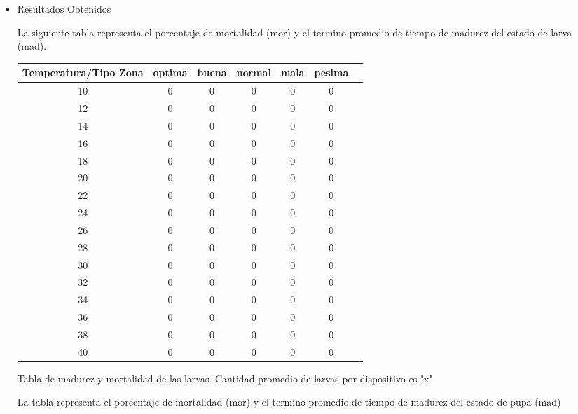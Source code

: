 \documentclass[a4paper]{article}
\begin{document}
\begin{itemize}
\item Resultados Obtenidos

La siguiente tabla representa el porcentaje de mortalidad (mor) y el termino
promedio de tiempo de madurez del estado de larva (mad).\\

\begin{tabular}{c*{5}{c}r}
Temperatura/Tipo Zona              &optima&buena &normal & mala & pesima  \\
\hline
10 & 0 & 0 & 0 & 0 & 0   \\
12 & 0 & 0 & 0 & 0 & 0   \\
14 & 0 & 0 & 0 & 0 & 0   \\
16 & 0 & 0 & 0 & 0 & 0   \\
18 & 0 & 0 & 0 & 0 & 0   \\
20 & 0 & 0 & 0 & 0 & 0   \\
22 & 0 & 0 & 0 & 0 & 0   \\
24 & 0 & 0 & 0 & 0 & 0   \\
26 & 0 & 0 & 0 & 0 & 0   \\
28 & 0 & 0 & 0 & 0 & 0   \\
30 & 0 & 0 & 0 & 0 & 0   \\
32 & 0 & 0 & 0 & 0 & 0   \\
34 & 0 & 0 & 0 & 0 & 0   \\
36 & 0 & 0 & 0 & 0 & 0   \\
38 & 0 & 0 & 0 & 0 & 0   \\
40 & 0 & 0 & 0 & 0 & 0   \\
\end{tabular}

Tabla de madurez y mortalidad de las larvas. Cantidad promedio de larvas
por dispositivo es "x"

La tabla representa el porcentaje de mortalidad (mor) y el termino
promedio de tiempo de madurez del estado de pupa (mad)


\end{itemize}
\end{document}
